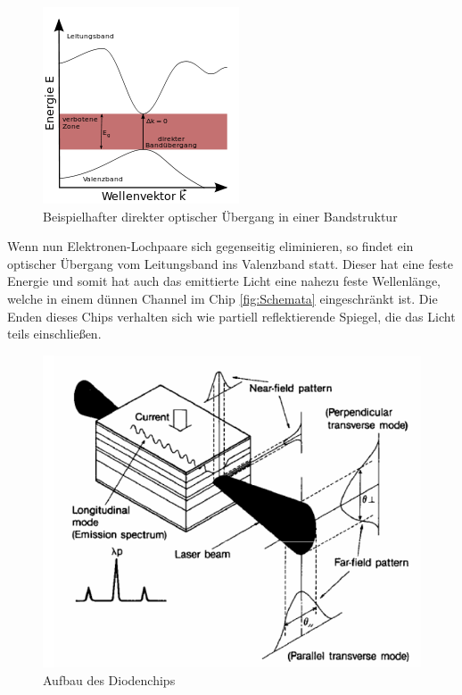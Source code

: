 \begin{figure}[H]
    \centering
    \includegraphics[width=\textwidth]{Bilder/Bandstruktur.png} 
    \caption{Beispielhafter direkter optischer Übergang in einer Bandstruktur \cite{Bandstruktur}}
    \label{fig:Bandstruktur}
\end{figure}

Wenn nun Elektronen-Lochpaare sich gegenseitig eliminieren, so findet ein optischer Übergang vom Leitungsband ins Valenzband statt. 
Dieser hat eine feste Energie und somit hat auch das emittierte Licht eine nahezu feste Wellenlänge, 
welche in einem dünnen Channel im Chip \eqref{fig:Schemata} eingeschränkt ist. 
Die Enden dieses Chips verhalten sich wie partiell reflektierende Spiegel, die das Licht teils einschließen. 

\begin{figure}[H]
    \centering
    \includegraphics[width=\textwidth]{Bilder/Schemata.png} 
    \caption{Aufbau des Diodenchips \cite{bk:LASER}}
    \label{fig:Schemata}
\end{figure}


